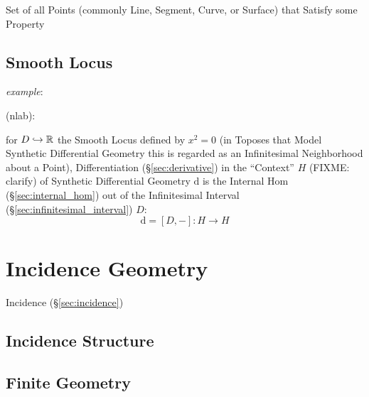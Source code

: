 
Set of all Points (commonly Line, Segment, Curve, or Surface) that Satisfy some
Property




\subsection{Smooth Locus}\label{sec:smooth_locus}

\emph{example}:

(nlab):

for $D \hookrightarrow \mathbb{R}$ the Smooth Locus defined by $x^2 = 0$ (in Toposes
that Model Synthetic Differential Geometry this is regarded as an Infinitesimal
Neighborhood about a Point), Differentiation (\S\ref{sec:derivative}) in the
``Context'' $H$ (FIXME: clarify) of Synthetic Differential Geometry $\mathrm{d}$
is the Internal Hom (\S\ref{sec:internal_hom}) out of the Infinitesimal Interval
(\S\ref{sec:infinitesimal_interval}) $D$:
\[
  \mathrm{d} = [D,-] : H \rightarrow H
\]



\section{Incidence Geometry}\label{sec:incidence_geometry}

Incidence (\S\ref{sec:incidence})



\subsection{Incidence Structure}\label{sec:incidence_structure}

\subsection{Finite Geometry}\label{sec:finite_geometry}

